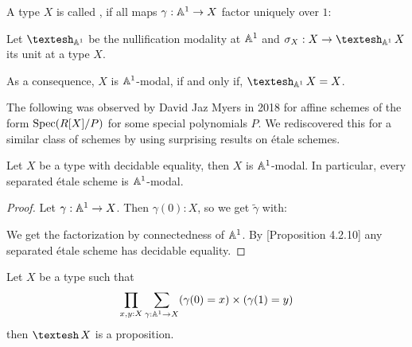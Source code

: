 
\begin{definition}
  A type $X$ is called , if all maps $\gamma:\mathbb{A}^1\to X$ factor uniquely over $1$:
  \begin{center}
  \end{center}
\end{definition}

\begin{definition}
  Let $\shape_{\A^1}$ be the nullification modality at $\mathbb{A}^1$ and $\sigma_X:X\to \shape_{\A^1}X$ its unit at a type $X$. 
\end{definition}

As a consequence, $X$ is $\mathbb{A}^1$-modal, if and only if, $\shape_{\A^1}X=X$.

The following was observed by David Jaz Myers in 2018 for affine schemes of the form $\operatorname{Spec} (R[X]/P)$ for some special polynomials $P$.
We rediscovered this for a similar class of schemes by using surprising results on étale schemes.

\begin{proposition}
  Let $X$ be a type with decidable equality, then $X$ is $\mathbb{A}^1$-modal.
  In particular, every separated étale scheme is $\mathbb{A}^1$-modal.
\end{proposition}

\begin{proof}
  Let $\gamma:\mathbb{A}^1\to X$.
  Then $\gamma(0):X$, so we get $\tilde{\gamma}$ with:
  \begin{center}
  \end{center}
  We get the factorization by connectedness of $\mathbb{A}^1$.
  By \cite{etale-draft}[Proposition 4.2.10] any separated étale scheme has decidable equality.
\end{proof}

\begin{lemma}
  \label{A1-paths-to-A1-prop}
  Let $X$ be a type such that
  \[
  \prod_{x,y:X} \sum_{\gamma:\mathbb{A}^1\to X} (\gamma(0)=x)\times (\gamma(1)=y)
  \]
  then $\shape X$ is a proposition.
\end{lemma}


